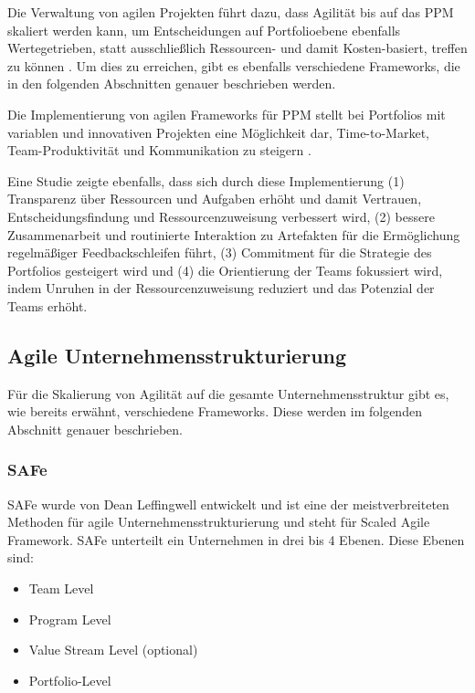 Die Verwaltung von agilen Projekten führt dazu, dass Agilität bis auf das PPM skaliert werden kann, um Entscheidungen auf Portfolioebene ebenfalls Wertegetrieben, statt ausschließlich Ressourcen- und damit Kosten-basiert, treffen zu können \cite{SUAREZ2022-1}. Um dies zu erreichen, gibt es ebenfalls verschiedene Frameworks, die in den folgenden Abschnitten genauer beschrieben werden.

Die Implementierung von agilen Frameworks für PPM stellt bei Portfolios mit variablen und innovativen Projekten eine Möglichkeit dar, Time-to-Market, Team-Produktivität und Kommunikation zu steigern \cite{SUAREZ2022-2}.

Eine Studie \cite{anEmpiricalPerspectiveOnThePractiveInUse} zeigte ebenfalls, dass sich durch diese Implementierung (1) Transparenz über Ressourcen und Aufgaben erhöht und damit Vertrauen, Entscheidungsfindung und Ressourcenzuweisung verbessert wird, (2) bessere Zusammenarbeit und routinierte Interaktion zu Artefakten für die Ermöglichung regelmäßiger Feedbackschleifen führt, (3) Commitment für die Strategie des Portfolios gesteigert wird und (4) die Orientierung der Teams fokussiert wird, indem Unruhen in der Ressourcenzuweisung reduziert und das Potenzial der Teams erhöht.

\subsection{Agile Unternehmensstrukturierung}
Für die Skalierung von Agilität auf die gesamte Unternehmensstruktur gibt es, wie bereits erwähnt, verschiedene Frameworks. Diese werden im folgenden Abschnitt genauer beschrieben.

\subsubsection{SAFe}
SAFe wurde von Dean Leffingwell entwickelt und ist eine der meistverbreiteten Methoden für agile Unternehmensstrukturierung und steht für Scaled Agile Framework.
SAFe unterteilt ein Unternehmen in drei bis 4 Ebenen. Diese Ebenen sind:

\begin{itemize}
    \item Team Level
    \item Program Level
    \item Value Stream Level (optional)
    \item Portfolio-Level
\end{itemize}

